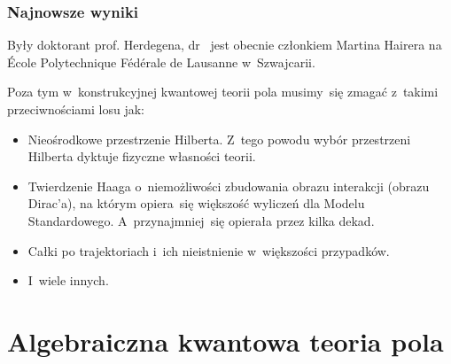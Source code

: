 \documentclass[10pt,t]{beamer}
\begin{document}
\begin{frame}
  \frametitle{Najnowsze wyniki}


  Były doktorant prof. Herdegena,
  dr~ jest obecnie
  członkiem 
  Martina Hairera na École Polytechnique Fédérale de Lausanne
  w~Szwajcarii.

  Poza tym w~konstrukcyjnej kwantowej teorii pola musimy~się
  zmagać z~takimi przeciwnościami losu jak:
  \begin{itemize}

  \item Nieośrodkowe przestrzenie Hilberta. Z~tego powodu wybór przestrzeni
    Hilberta dyktuje \alert{fizyczne} własności teorii.

  \item Twierdzenie Haaga o~niemożliwości zbudowania obrazu interakcji
    (obrazu Dirac’a), na którym opiera~się większość wyliczeń dla Modelu
    Standardowego. A~przynajmniej~się opierała przez kilka dekad.

  \item Całki po trajektoriach i~ich nieistnienie w~większości przypadków.

  \item I~wiele innych.

  \end{itemize}

\end{frame}










\section{Algebraiczna kwantowa teoria pola}
\end{document}
